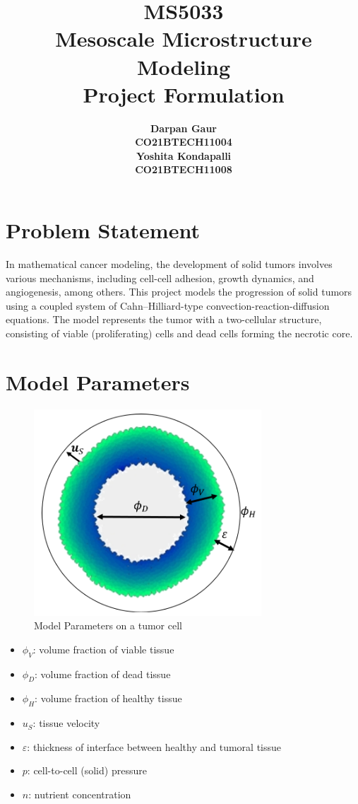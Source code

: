 \documentclass[12pt]{article}
\title{
    \textbf{MS5033} \\
    \textbf{Mesoscale Microstructure Modeling} \\ 
    \textbf{Project Formulation} \\
}
\author{
    \begin{tabular}{c}
        \textbf{Darpan Gaur} \\
        \textbf{CO21BTECH11004}
    \end{tabular}
    \begin{tabular}{c}
        \textbf{Yoshita Kondapalli} \\
        \textbf{CO21BTECH11008}
    \end{tabular}
}
\date{}
\begin{document}
\maketitle

\hrulefill

\section*{Problem Statement}
In mathematical cancer modeling, the development of solid tumors involves various mechanisms, including cell-cell adhesion, growth dynamics, and angiogenesis, among others. This project models the progression of solid tumors using a coupled system of Cahn–Hilliard-type convection-reaction-diffusion equations. The model represents the tumor with a two-cellular structure, consisting of viable (proliferating) cells and dead cells forming the necrotic core.

\section*{Model Parameters}

\begin{figure}[h]
    \centering
    \includegraphics[width=0.5\linewidth]{modelParam.png}
    \caption{Model Parameters on a tumor cell}
    \label{fig:enter-label}
\end{figure}
\begin{itemize}
    \item $\phi_V$: volume fraction of viable tissue
    \item $\phi_D$: volume fraction of dead tissue
    \item $\phi_H$: volume fraction of healthy tissue
    \item $u_S$: tissue velocity
    \item $\varepsilon$: thickness of interface between healthy and tumoral tissue
    \item $p$: cell-to-cell (solid) pressure
    \item $n$: nutrient concentration
\end{itemize}
\end{document}
